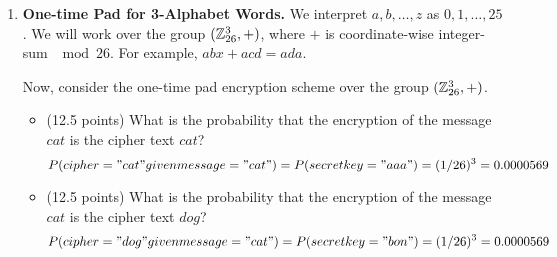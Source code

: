 \documentclass[11pt]{article}
\newcommand{\nextoddpage}{\checkoddpage\ifoddpage{\ \newpage\ \newpage}\else{\ \newpage}\fi}
\begin{document}
\begin{enumerate}
  The multiplication ($\times$ operator) of the element $(a_0,a_1,a_2)$ with the element $(b_0,b_1,b_2)$ is defined as the element corresponding to the polynomial
    $$(a_0 + a_1X + a_2X^2) \times (b_0 + b_1X + b_2X^2) \mod X^3 + 2X + 2$$
  According to this definition of the $\times$ operator, find
  \begin{itemize}
  \item (10 points) $(1,2,1) \times (2,2,1) $
  \item (15 points) the inverse of $(1,2,1)$.
  \end{itemize}
  {\bfseries Solution.} 
  \begin{itemize} 
  \item $(1,2,1) \times (2,2,1) $
   	\[(a_0 + a_1X + a_2X^2) \times (b_0 + b_1X + b_2X^2) \mod X^3 + 2X + 22\]
 	\[(1 + 2X + X^2) \times (2 + 2X + X^2) \mod X^3 + 2X + 2\]
 	\[2 + 4X +2X^2) + (2X + 4X^2 + 2X^3) + (X^2 + 2X^3 + X^4 \mod X^3 + 2X + 2\]
 	\[2 + 0X + X^2 + X^3 + X^4 \mod X^3 + 2X + 2\]
 	\[2 + 0X + X^2 - (2X+2) - (2X^2+2X) \mod X^3 + 2X + 2\]
 	\[0 + 2X + 2X^2 \mod X^3 + 2X + 2\]
 	\[(0, 2, 2)\]
  \item the inverse of $(1,2,1)$. 
 	\[(1 + 2X + X^2) \times (b_0 + b_1X + b_2X^2) \mod X^3 + 2X + 2\]
 	\[(b_0 + b_1X + b_2X^2) + (2b_0X + 2b_1X^2 + 2b_2X^3) + (b_0X^2 + b_1X^3 + b_2X^4) \mod X^3 + 2X + 2\]
 	\[b_0 + (b_1+2b_0)X + (b_2+2b_1+b_0)X^2 + (2b_2+b_1)X^3 + b_2X^4 \mod X^3 + 2X + 2\]
 	\[b_0 + (b_1+2b_0)X + (b_2+2b_1+b_0)X^2 - (2b_2+b_1)(2X+2) - b_2(2X^2+2X) \mod X^3 + 2X + 2\]
 	\[b_0 + (b_1+2b_0)X + (b_2+2b_1+b_0)X^2 - (b_2+2b_1) - (b_2+2b_1)X - (2b_2)X - (2b_2)X^2 \mod X^3 + 2X + 2\]
 	\[(b_0+b_1+2b_2) + (2b_0+2b_1)X + (2b_2+2b_1+b_0)X^2 \mod X^3 + 2X + 2\]
 	\[(0, 0, 0) \textrm{ when } b_0 = 2, b_1 = 2, b_2 = 1\]
 	\[(1, 2, 2)\]
  \end{itemize}

\nextoddpage 
\item {\bfseries One-time Pad for 3-Alphabet Words.} 
  We interpret $a,b,\dotsc,z$ as $0,1,\dotsc,25$. 
  We will work over the group $({\mathbb Z}^3_{26},+)$, where $+$ is coordinate-wise integer-sum $\mod 26$. 
  For example, $abx + acd = ada$. 
  
  Now, consider the one-time pad encryption scheme over the group $({\mathbb Z}^3_{26},+)$. 
  \begin{itemize}
  \item (12.5 points) What is the probability that the encryption of the message $cat$ is the cipher text $cat$?
  $$P(cipher="cat" given message="cat") = P(secretkey="aaa") = (1/26)^3 = 0.0000569$$
  \item (12.5 points) What is the probability that the encryption of the message $cat$ is the cipher text $dog$? 
  $$P(cipher="dog" given message="cat") = P(secretkey="bon") = (1/26)^3 = 0.0000569$$
  \end{itemize}  
  

\end{enumerate}
\end{document}
